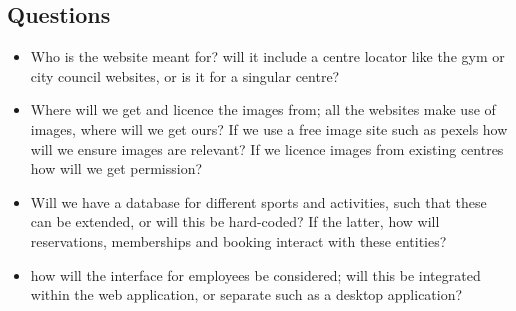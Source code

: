 \documentclass[12pt,a4paper]{article}
\begin{document}
\subsection{Questions}

\begin{itemize}
	\item Who is the website meant for? will it include a centre locator like the gym or city council websites, or is it for a singular centre?
	
	\item Where will we get and licence the images from; all the websites make use of images, where will we get ours? If we use a free image site such as pexels how will we ensure images are relevant? If we licence images from existing centres how will we get permission?
	
	\item Will we have a database for different sports and activities, such that these can be extended, or will this be hard-coded? If the latter, how will reservations, memberships and booking interact with these entities?
	
	\item how will the interface for employees be considered; will this be integrated within the web application, or separate such as a desktop application?
	
	
	
	
\end{itemize}
\end{document}
